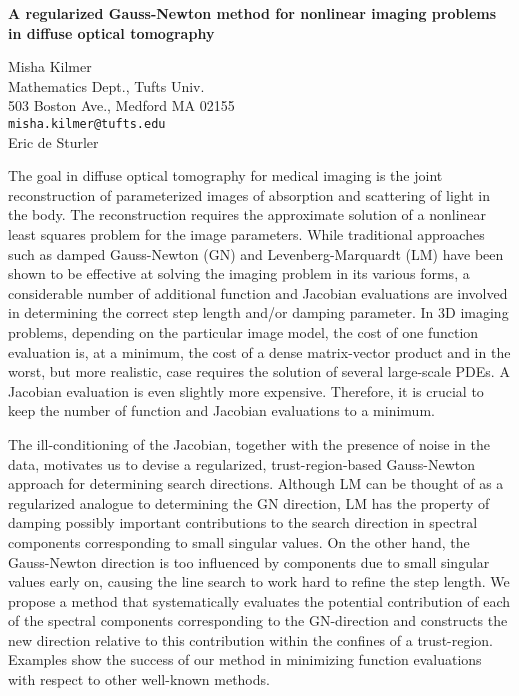 \documentclass{report}
\begin{document}

\begin{center}
{\large
{\bf A regularized Gauss-Newton method for nonlinear imaging problems \\
	in diffuse optical tomography}}

	Misha Kilmer \\
	Mathematics Dept., Tufts Univ. \\
	503 Boston Ave.,  Medford MA 02155 \\
	{\tt misha.kilmer@tufts.edu} \\
	Eric de Sturler
\end{center}
The goal in diffuse optical tomography for medical imaging
is the joint reconstruction of parameterized images of
absorption and scattering of light in the body. The
reconstruction requires the approximate solution of a
nonlinear least squares problem for the image parameters.
While traditional approaches such as damped Gauss-Newton
(GN) and Levenberg-Marquardt (LM) have been shown to be
effective at solving the imaging problem in its various
forms, a considerable number of additional function and
Jacobian evaluations are involved in determining the correct
step length and/or damping parameter. In 3D imaging
problems, depending on the particular image model, the cost
of one function evaluation is, at a minimum, the cost of a
dense matrix-vector product and in the worst, but more
realistic, case requires the solution of several large-scale
PDEs. A Jacobian evaluation is even slightly more
expensive. Therefore, it is crucial to keep the number of
function and Jacobian evaluations to a minimum.

The
ill-conditioning of the Jacobian, together with the presence
of noise in the data, motivates us to devise a regularized,
trust-region-based Gauss-Newton approach for determining
search directions. Although LM can be thought of as a
regularized analogue to determining the GN direction, LM has
the property of damping possibly important contributions to
the search direction in spectral components corresponding to
small singular values. On the other hand, the Gauss-Newton
direction is too influenced by components due to small
singular values early on, causing the line search to work
hard to refine the step length. We propose a method that
systematically evaluates the potential contribution of each
of the spectral components corresponding to the GN-direction
and constructs the new direction relative to this
contribution within the confines of a trust-region. Examples
show the success of our method in minimizing function
evaluations with respect to other well-known methods.



\end{document}
